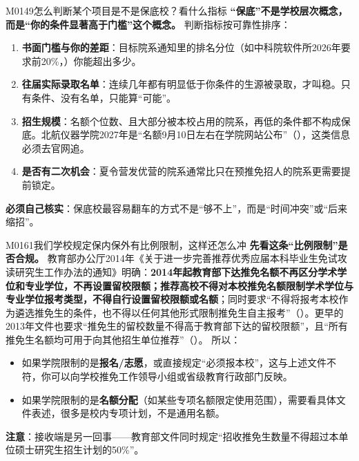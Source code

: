 \begin{qa}{M0149}{怎么判断某个项目是不是保底校？看什么指标}
\textbf{“保底”不是学校层次概念，而是“你的条件显著高于门槛”这个概念。} 判断指标按可靠性排序：
\begin{enumerate}
  \item \textbf{书面门槛与你的差距}：目标院系通知里的排名分位（如中科院软件所2026年要求前20\%，）你能超出多少。
  \item \textbf{往届实际录取名单}：连续几年都有明显低于你条件的生源被录取，才叫稳。只有条件、没有名单，只能算“可能”。
  \item \textbf{招生规模}：名额个位数、且大部分被本校占用的院系，再低的条件都不构成保底。北航仪器学院2027年是“名额9月10日左右在学院网站公布”（），这类信息必须去官网追。
  \item \textbf{是否有二次机会}：夏令营发优营的院系通常比只在预推免招人的院系更需要提前锁定。
\end{enumerate}
\textbf{必须自己核实}：保底校最容易翻车的方式不是“够不上”，而是“时间冲突”或“后来缩招”。
\end{qa}

\begin{qa}{M0161}{我们学校规定保内保外有比例限制，这样还怎么冲}
\textbf{先看这条“比例限制”是否合规。} 教育部办公厅2014年《关于进一步完善推荐优秀应届本科毕业生免试攻读研究生工作办法的通知》明确：\textbf{2014年起教育部下达推免名额不再区分学术学位和专业学位，不再设置留校限额；推荐高校不得对本校推免名额限制学术学位与专业学位报考类型，不得自行设置留校限额或名额}；同时要求“不得将报考本校作为遴选推免生的条件，也不得以任何其他形式限制推免生自主报考”（）。更早的2013年文件也要求“推免生的留校数量不得高于教育部下达的留校限额”，且“所有推免生名额均可用于向其他招生单位推荐”（）。
所以：
\begin{itemize}
  \item 如果学院限制的是\textbf{报名/志愿}，或直接规定“必须报本校”，这与上述文件不符，你可以向学校推免工作领导小组或省级教育行政部门反映。
  \item 如果学院限制的是\textbf{名额分配}（如某些专项名额限定使用范围），需要看具体文件表述，很多是校内专项计划，不是通用名额。
\end{itemize}
\textbf{注意}：接收端是另一回事——教育部文件同时规定“招收推免生数量不得超过本单位硕士研究生招生计划的50\%”。
\end{qa}

